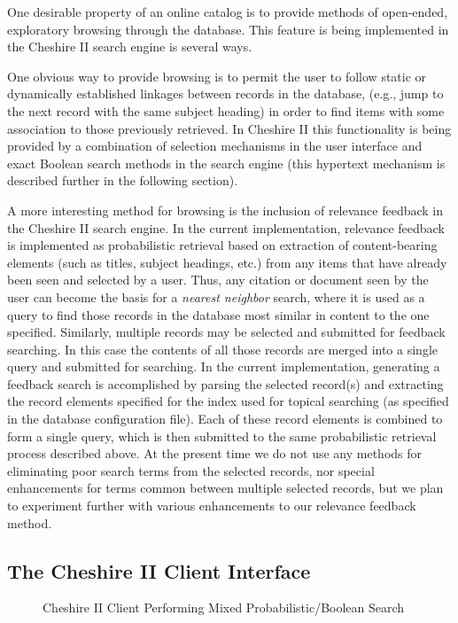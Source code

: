 One desirable property of an online catalog is to provide methods of
open-ended, exploratory browsing through the database. This feature is
being implemented in the Cheshire II search engine is several ways.

One obvious way to provide browsing is to permit the user to follow 
static or dynamically established linkages between records in the database, 
(e.g., jump to the next record with the same subject heading) in order 
to find items with some association to those previously retrieved. In
Cheshire II this functionality is being provided by a combination of
selection mechanisms in the user interface and exact Boolean search methods
in the search engine (this hypertext mechanism is described further
in the following section). 

A more interesting method for browsing is the inclusion of
relevance feedback in the Cheshire II search engine. In the current
implementation, relevance feedback is implemented as probabilistic
retrieval based on extraction of content-bearing elements (such as
titles, subject headings, etc.) from any items that have already been
seen and selected by a user. Thus, any citation or document seen by
the user can become the basis for a {\em nearest neighbor} search, where
it is used as a query to find those records in the database most
similar in content to the one specified. Similarly, multiple records
may be selected and submitted for feedback searching. In this case
the contents of all those records are merged into a single query and
submitted for searching. In the current implementation, generating a
feedback search is accomplished by parsing the selected record(s) and
extracting the record elements specified for the index used for topical
searching (as specified in the database configuration file). Each of these
record elements is combined to form a single query, which is then
submitted to the same probabilistic retrieval process described above.
At the present time we do not use any methods
for eliminating poor search terms from the selected records, nor
special enhancements for terms common between multiple selected 
records\cite{FEEDBACK}, but we plan to experiment further with various
enhancements to our relevance feedback method.


\subsection{The Cheshire II Client Interface}

\begin{figure}[t]
\begin{center}
\caption{Cheshire II Client Performing Mixed Probabilistic/Boolean
Search}
\label{ranked}
\end{center}
\end{figure}

